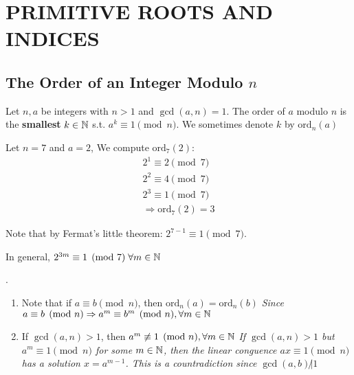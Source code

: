 \chapter{PRIMITIVE ROOTS AND INDICES}

\section{The Order of an Integer Modulo $n$}

\setcounter{definition}{0}
\setcounter{theorem}{0}

\begin{definition}
    Let $n, a$ be integers with $n>1$ and $\gcd(a, n) = 1$.
    The order of $a$ modulo $n$ is the \textbf{smallest} $k \in \mathbb{N}$ s.t. $a^k \equiv 1 \pmod n$.
    We sometimes denote $k$ by $\text{ord}_n(a)$
\end{definition}
\begin{eg}
    Let $n = 7$ and $a = 2$, We compute $\text{ord}_7(2)$:
    \[
        \begin{aligned}
            2^1 \equiv 2 \pmod 7 \\
            2^2 \equiv 4 \pmod 7 \\
            2^3 \equiv 1 \pmod 7 \\
            \Rightarrow \text{ord}_7(2) = 3
        \end{aligned}
    \]

    Note that by Fermat's little theorem: $2^{7-1} \equiv 1 \pmod 7$.

    In general, $2^{3m} \equiv 1 \pmod 7 \; \forall m \in \mathbb{N}$
\end{eg}
\begin{remark}
    .
    \begin{enumerate}
        \item Note that if $a \equiv b \pmod n$, then $\text{ord}_n(a) = \text{ord}_n(b)$\newline
        \emph{Since $a \equiv b \pmod n \Rightarrow a^m \equiv b^m \pmod n , \forall m \in \mathbb{N}$}

        \item If $\gcd(a, n) > 1$, then $a^m \not\equiv 1 \pmod n, \forall m \in \mathbb{N}$\newline
        \emph{If $\gcd(a, n) > 1$ but $a^m \equiv 1 \pmod n$ for some $m \in \mathbb{N}$, then
        the linear conguence $ax \equiv 1 \pmod n$ has a solution $x = a^{m-1}$. This is a countradiction
        since $\gcd(a, b) \not | 1$}
    \end{enumerate}
\end{remark}

